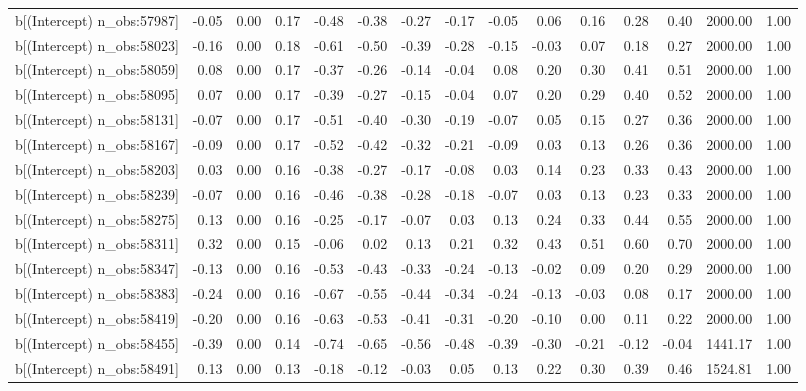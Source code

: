 \begin{table}[ht]
\begin{tabular}{rrrrrrrrrrrrrrr}
  b[(Intercept) n\_obs:57987] & -0.05 & 0.00 & 0.17 & -0.48 & -0.38 & -0.27 & -0.17 & -0.05 & 0.06 & 0.16 & 0.28 & 0.40 & 2000.00 & 1.00 \\ 
  b[(Intercept) n\_obs:58023] & -0.16 & 0.00 & 0.18 & -0.61 & -0.50 & -0.39 & -0.28 & -0.15 & -0.03 & 0.07 & 0.18 & 0.27 & 2000.00 & 1.00 \\ 
  b[(Intercept) n\_obs:58059] & 0.08 & 0.00 & 0.17 & -0.37 & -0.26 & -0.14 & -0.04 & 0.08 & 0.20 & 0.30 & 0.41 & 0.51 & 2000.00 & 1.00 \\ 
  b[(Intercept) n\_obs:58095] & 0.07 & 0.00 & 0.17 & -0.39 & -0.27 & -0.15 & -0.04 & 0.07 & 0.20 & 0.29 & 0.40 & 0.52 & 2000.00 & 1.00 \\ 
  b[(Intercept) n\_obs:58131] & -0.07 & 0.00 & 0.17 & -0.51 & -0.40 & -0.30 & -0.19 & -0.07 & 0.05 & 0.15 & 0.27 & 0.36 & 2000.00 & 1.00 \\ 
  b[(Intercept) n\_obs:58167] & -0.09 & 0.00 & 0.17 & -0.52 & -0.42 & -0.32 & -0.21 & -0.09 & 0.03 & 0.13 & 0.26 & 0.36 & 2000.00 & 1.00 \\ 
  b[(Intercept) n\_obs:58203] & 0.03 & 0.00 & 0.16 & -0.38 & -0.27 & -0.17 & -0.08 & 0.03 & 0.14 & 0.23 & 0.33 & 0.43 & 2000.00 & 1.00 \\ 
  b[(Intercept) n\_obs:58239] & -0.07 & 0.00 & 0.16 & -0.46 & -0.38 & -0.28 & -0.18 & -0.07 & 0.03 & 0.13 & 0.23 & 0.33 & 2000.00 & 1.00 \\ 
  b[(Intercept) n\_obs:58275] & 0.13 & 0.00 & 0.16 & -0.25 & -0.17 & -0.07 & 0.03 & 0.13 & 0.24 & 0.33 & 0.44 & 0.55 & 2000.00 & 1.00 \\ 
  b[(Intercept) n\_obs:58311] & 0.32 & 0.00 & 0.15 & -0.06 & 0.02 & 0.13 & 0.21 & 0.32 & 0.43 & 0.51 & 0.60 & 0.70 & 2000.00 & 1.00 \\ 
  b[(Intercept) n\_obs:58347] & -0.13 & 0.00 & 0.16 & -0.53 & -0.43 & -0.33 & -0.24 & -0.13 & -0.02 & 0.09 & 0.20 & 0.29 & 2000.00 & 1.00 \\ 
  b[(Intercept) n\_obs:58383] & -0.24 & 0.00 & 0.16 & -0.67 & -0.55 & -0.44 & -0.34 & -0.24 & -0.13 & -0.03 & 0.08 & 0.17 & 2000.00 & 1.00 \\ 
  b[(Intercept) n\_obs:58419] & -0.20 & 0.00 & 0.16 & -0.63 & -0.53 & -0.41 & -0.31 & -0.20 & -0.10 & 0.00 & 0.11 & 0.22 & 2000.00 & 1.00 \\ 
  b[(Intercept) n\_obs:58455] & -0.39 & 0.00 & 0.14 & -0.74 & -0.65 & -0.56 & -0.48 & -0.39 & -0.30 & -0.21 & -0.12 & -0.04 & 1441.17 & 1.00 \\ 
  b[(Intercept) n\_obs:58491] & 0.13 & 0.00 & 0.13 & -0.18 & -0.12 & -0.03 & 0.05 & 0.13 & 0.22 & 0.30 & 0.39 & 0.46 & 1524.81 & 1.00 \\ 

\end{tabular}
\end{table}
